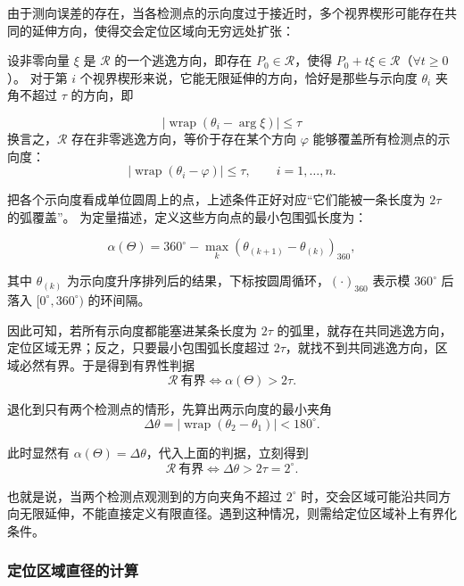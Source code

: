 \documentclass[withoutpreface,bwprint]{cumcmthesis} %
\begin{document}
由于测向误差的存在，当各检测点的示向度过于接近时，多个视界楔形可能存在共同的延伸方向，使得交会定位区域向无穷远处扩张：

设非零向量 $\xi$ 是 $\mathcal R$ 的一个逃逸方向，即存在 $P_0\in\mathcal R$，使得 $P_0+t\xi\in\mathcal R$（$\forall t\geq0$）。
对于第 $i$ 个视界楔形来说，它能无限延伸的方向，恰好是那些与示向度 $\theta_i$ 夹角不超过 $\tau$ 的方向，即

\begin{equation}
\left| \operatorname{wrap} \left( \theta_i-\arg\xi \right) \right| \leq\tau
\end{equation}
换言之，$\mathcal R$ 存在非零逃逸方向，等价于存在某个方向 $\varphi$ 能够覆盖所有检测点的示向度：
\[
\left| \operatorname{wrap}(\theta_i-\varphi) \right| \leq\tau, \qquad i=1,\ldots,n.
\]

把各个示向度看成单位圆周上的点，上述条件正好对应“它们能被一条长度为 $2\tau$ 的弧覆盖”。
为定量描述，定义这些方向点的最小包围弧长度为：

\begin{equation}
\alpha(\Theta) = 360^\circ- \max_k \left( \theta_{(k+1)}-\theta_{(k)} \right)_{360},
\end{equation}

其中 $\theta_{(k)}$ 为示向度升序排列后的结果，下标按圆周循环，$(\cdot)_{360}$ 表示模 $360^\circ$ 后落入 $[0^\circ,360^\circ)$ 的环间隔。

因此可知，若所有示向度都能塞进某条长度为 $2\tau$ 的弧里，就存在共同逃逸方向，定位区域无界；反之，只要最小包围弧长度超过 $2\tau$，就找不到共同逃逸方向，区域必然有界。于是得到有界性判据
\begin{equation}
\mathcal R\ \text{有界} \iff \alpha(\Theta)>2\tau.
\end{equation}

退化到只有两个检测点的情形，先算出两示向度的最小夹角
\begin{equation}
\Delta\theta = \left| \operatorname{wrap}(\theta_2-\theta_1) \right| <180^\circ.
\end{equation}

此时显然有 $\alpha(\Theta)=\Delta\theta$，代入上面的判据，立刻得到
\begin{equation}
\mathcal R\ \text{有界} \iff \Delta\theta>2\tau=2^\circ.
\end{equation}

也就是说，当两个检测点观测到的方向夹角不超过 $2^\circ$ 时，交会区域可能沿共同方向无限延伸，不能直接定义有限直径。遇到这种情况，则需给定位区域补上有界化条件。

\subsubsection{定位区域直径的计算}
\end{document}
